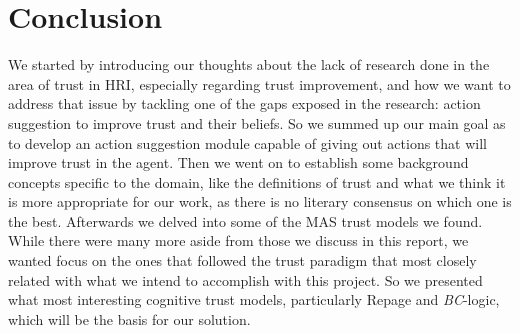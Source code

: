 \section{Conclusion}
\label{sec:Conclusion}
We started by introducing our thoughts about the lack of research done in the area of trust in \ac{HRI}, especially regarding trust improvement, and how we want to address that issue by tackling one of the gaps exposed in the research: action suggestion to improve trust and their beliefs. So we summed up our main goal as to develop an action suggestion module capable of giving out actions that will improve trust in the agent. Then we went on to establish some background concepts specific to the domain, like the definitions of trust and what we think it is more appropriate for our work, as there is no literary consensus on which one is the best. Afterwards we delved into some of the \ac{MAS} trust models we found. While there were many more aside from those we discuss in this report, we wanted focus on the ones that followed the trust paradigm that most closely related with what we intend to accomplish with this project. So we presented what most interesting cognitive trust models, particularly Repage and \textit{BC}-logic, which will be the basis for our solution.